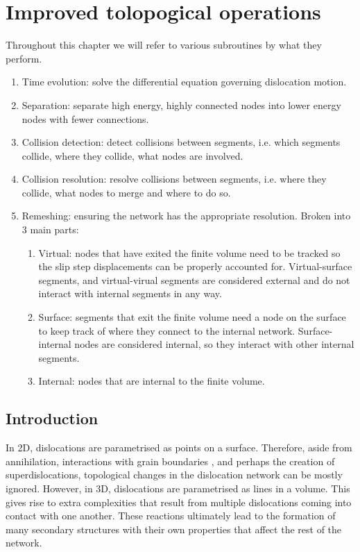 \chapter{Improved tolopogical operations}
\label{c:topology}

Throughout this chapter we will refer to various subroutines by what they perform.
\begin{enumerate}
    \item Time evolution: solve the differential equation governing dislocation motion.
    \item Separation: separate high energy, highly connected nodes into lower energy nodes with fewer connections.
    \item Collision detection: detect collisions between segments, i.e. which segments collide, where they collide, what nodes are involved.
    \item Collision resolution: resolve collisions between segments, i.e. where they collide, what nodes to merge and where to do so.
    \item Remeshing: ensuring the network has the appropriate resolution. Broken into 3 main parts:
          \begin{enumerate}
              \item Virtual: nodes that have exited the finite volume need to be tracked so the slip step displacements can be properly accounted for. Virtual-surface segments, and virtual-virual segments are considered external and do not interact with internal segments in any way.
              \item Surface: segments that exit the finite volume need a node on the surface to keep track of where they connect to the internal network. Surface-internal nodes are considered internal, so they interact with other internal segments.
              \item Internal: nodes that are internal to the finite volume.
          \end{enumerate}
\end{enumerate}

\section{Introduction}

In 2D, dislocations are parametrised as points on a surface. Therefore, aside from annihilation, interactions with grain boundaries \cite{grain_size_eff1, grain_size_eff2}, and perhaps the creation of superdislocations, topological changes in the dislocation network can be mostly ignored. However, in 3D, dislocations are parametrised as lines in a volume. This gives rise to extra complexities that result from multiple dislocations coming into contact with one another. These reactions ultimately lead to the formation of many secondary structures with their own properties that affect the rest of the network.

